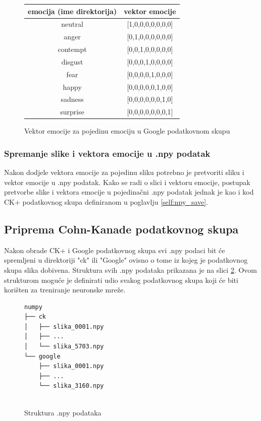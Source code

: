 \documentclass[times, utf8, zavrsni,numeric]{fer}
\begin{document}
\begin{figure}[H]
\centering
\begin{tabular}{|c|c|} 
\hline
emocija (ime direktorija) & vektor emocije \\
\hline
neutral & [1,0,0,0,0,0,0,0] \\
anger	& [0,1,0,0,0,0,0,0] \\
contempt & [0,0,1,0,0,0,0,0] \\
disgust & [0,0,0,1,0,0,0,0]\\
fear  & [0,0,0,0,1,0,0,0]\\
happy & [0,0,0,0,0,1,0,0]\\
sadness & [0,0,0,0,0,0,1,0]\\
surprise & [0,0,0,0,0,0,0,1]\\
\hline
\end{tabular}
\caption{Vektor emocije za pojedinu emociju u Google podatkovnom skupu}
\label{pic:google_emotion_emo_vector}
\end{figure}

\subsubsection{Spremanje slike i vektora emocije u .npy podatak}
Nakon dodjele vektora emocije za pojedinu sliku potrebno je pretvoriti sliku i vektor emocije u .npy podatak. Kako se radi o slici i vektoru emocije, postupak pretvorbe slike i vektora emocije u pojedinačni .npy podatak jednak je kao i kod CK+ podatkovnog skupa definiranom u poglavlju \ref{self:npy_save}.


\subsection{Priprema Cohn-Kanade podatkovnog skupa}
Nakon obrade CK+ i Google podatkovnog skupa svi .npy podaci bit će spremljeni u direktoriji "ck" ili "Google" ovisno o tome iz kojeg je podatkovnog skupa slika dobivena. Struktura svih .npy podataka prikazana je na slici \ref{pic:npy_structure}. Ovom strukturom moguće je definirati udio svakog podatkovnog skupa koji će biti korišten za treniranje neuronske mreže.


\begin{figure}[H]
\centering
\begin{Verbatim}[fontsize=\small]
numpy
├── ck
│   ├── slika_0001.npy
│   ├── ...
│   └── slika_5703.npy
└── google
    ├── slika_0001.npy
    ├── ...
    └── slika_3160.npy
    

\end{Verbatim}
\caption{Struktura .npy podataka}
\label{pic:npy_structure}
\end{figure}
\end{document}
